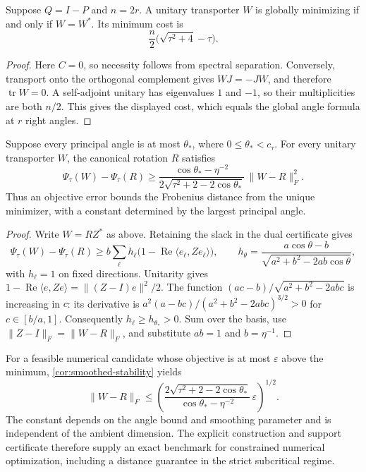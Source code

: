 \begin{corollary}
\label{cor:smoothed-complementary-right}
Suppose $Q=I-P$ and $n=2r$. A unitary transporter $W$ is globally
minimizing if and only if $W=W^*$. Its minimum cost is
\[
 \frac n2\bigl(\sqrt{\tau^2+4}-\tau\bigr).
\]
\end{corollary}

\begin{proof}
Here $C=0$, so necessity follows from spectral separation. Conversely,
transport onto the orthogonal complement gives $WJ=-JW$, and therefore
$\operatorname{tr}W=0$. A self-adjoint unitary has eigenvalues $1$ and
$-1$, so their multiplicities are both $n/2$. This gives the displayed
cost, which equals the global angle formula at $r$ right angles.
\end{proof}

\begin{corollary}
\label{cor:smoothed-stability}
Suppose every principal angle is at most $\theta_*$, where
$0\leq\theta_*<c_\tau$. For every
unitary transporter $W$, the canonical rotation $R$ satisfies
\[
 \Psi_\tau(W)-\Psi_\tau(R)
 \geq
 \frac{\cos\theta_*-\eta^{-2}}
      {2\sqrt{\tau^2+2-2\cos\theta_*}}\,\|W-R\|_F^2.
\]
Thus an objective error bounds the Frobenius distance from the unique
minimizer, with a constant determined by the largest principal angle.
\end{corollary}

\begin{proof}
Write $W=RZ^*$ as above. Retaining the slack in the dual certificate gives
\[
 \Psi_\tau(W)-\Psi_\tau(R)
 \geq b\sum_\ell h_\ell
       \bigl(1-\operatorname{Re}\langle e_\ell,Ze_\ell\rangle\bigr),
 \qquad
 h_\theta=\frac{a\cos\theta-b}
                  {\sqrt{a^2+b^2-2ab\cos\theta}},
\]
with $h_\ell=1$ on fixed directions. Unitarity gives
$1-\operatorname{Re}\langle e,Ze\rangle=\|(Z-I)e\|^2/2$.
The function $(ac-b)/\sqrt{a^2+b^2-2abc}$ is increasing in $c$:
its derivative is
$a^2(a-bc)/(a^2+b^2-2abc)^{3/2}>0$ for $c\in[b/a,1]$.
Consequently $h_\ell\geq h_{\theta_*}>0$. Sum over the basis, use
$\|Z-I\|_F=\|W-R\|_F$, and substitute $ab=1$ and $b=\eta^{-1}$.
\end{proof}


For a feasible numerical candidate whose objective is at most $\varepsilon$
above the minimum, \cref{cor:smoothed-stability} yields
\[
 \|W-R\|_F\leq
 \left(
 \frac{2\sqrt{\tau^2+2-2\cos\theta_*}}
      {\cos\theta_*-\eta^{-2}}\,\varepsilon
 \right)^{1/2}.
\]
The constant depends on the angle bound and smoothing parameter and is
independent of the ambient dimension. The explicit construction and
support certificate therefore supply an exact benchmark for constrained
numerical optimization, including a distance guarantee in the strict
subcritical regime.

